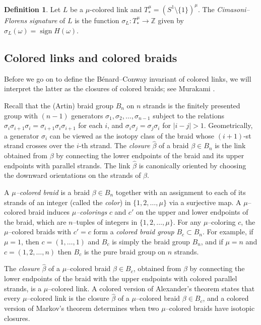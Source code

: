 \documentclass[11pt,reqno]{amsart}
\theoremstyle{definition}
\newtheorem{definition}[theorem]{Definition}
\newcommand{\sign}{\operatorname{sign}}
\begin{document}
\begin{sloppypar}
		\begin{definition}
			Let $L$ be a $\mu$-colored link and $T_*^{\mu} = (S^1 \setminus \lbrace 1 \rbrace)^{\mu}$. The \textit{Cimasoni--Florens signature} of $L$ is the function $\sigma_L: T_*^{\mu} \to \mathbb{Z}$ given by $\sigma_L(\omega) = \sign H(\omega)$.
		\end{definition}


\subsection{Colored links and colored braids}
Before we go on to define the B{\'e}nard--Conway invariant of colored links, we will interpret the latter as the closures of colored braids; see Murakami \cite{Murakami}.

Recall that the (Artin) braid group $B_n$ on $n$ strands is the finitely presented group with $(n-1)$ generators $\sigma_1, \sigma_2, \dots, \sigma_{n - 1}$ subject to the relations $\sigma_i \sigma_{i + 1} \sigma_i = \sigma_{i + 1} \sigma_i \sigma_{i + 1}$ for each $i$, and $\sigma_i \sigma_j = \sigma_j \sigma_i$ for $|i - j| > 1$. Geometrically, a generator $\sigma_i$ can be viewed as the isotopy class of the braid whose $(i+1)$-st strand crosses over the $i$-th strand. The \textit{closure} $\widehat{\beta}$ of a braid $\beta \in B_n$ is the link obtained from $\beta$ by connecting the lower endpoints of the braid and its upper endpoints with parallel strands. The link $\widehat\beta$ is canonically oriented by choosing the downward orientations on the strands of $\beta$. 

A \textit{$\mu$--colored braid} is a braid $\beta \in B_n$ together with an assignment to each of its strands of an integer (called the \textit{color}) in $\lbrace 1, 2, \dots, \mu \rbrace$ via a surjective map. A $\mu$--colored braid induces \textit{$\mu$--colorings} $c$ and $c'$ on the upper and lower endpoints of the braid, which are $n$--tuples of integers in $\lbrace 1,2,\ldots,\mu \rbrace$. For any $\mu$--coloring $c$, the $\mu$--colored braids with $c' = c$ form a \textit{colored braid group} $B_c \subset B_n$. For example, if $\mu = 1$, then $c = (1,\ldots,1)$ and $B_c$ is simply the braid group $B_n$, and if $\mu = n$ and $c = (1, 2, \dots, n )$ then $B_c$ is the pure braid group on $n$ strands. 

The \textit{closure} $\widehat{\beta}$ of a $\mu$--colored braid $\beta\in B_c$,  obtained from $\beta$ by connecting the lower endpoints of the braid with the upper endpoints with colored parallel strands, is a $\mu$--colored link. A colored version of Alexander's theorem states that every $\mu$--colored link is the closure $\widehat \beta$ of a $\mu$--colored braid $\beta \in B_c$, and a colored version of Markov's theorem determines when two $\mu$--colored braids have isotopic closures.


\end{sloppypar}
\end{document}
